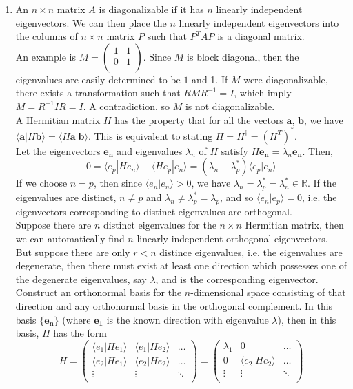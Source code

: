 \documentclass[a4paper]{article}
\begin{document}
\begin{ans}\leavevmode
\begin{enumerate}[label=(\alph*)]
\item An $n\times n$ matrix $A$ is diagonalizable if it has $n$ linearly independent eigenvectors. We can then place the $n$ linearly independent eigenvectors into the columns of $n\times n$ matrix $P$ such that $P^TAP$ is a diagonal matrix.\\[5pt]
An example is $M=\begin{pmatrix}1&1\\0&1\\\end{pmatrix}$. Since $M$ is block diagonal, then the eigenvalues are easily determined to be $1$ and 1. If $M$ were diagonalizable, there exists a transformation such that $RMR^{-1}=I$, which imply $M=R^{-1}IR=I$. A contradiction, so $M$ is not diagonalizable.\\[5pt]
A Hermitian matrix $H$ has the property that for all the vectors $\mathbf{a}$, $\mathbf{b}$, we have $\langle \mathbf{a}|H\mathbf{b}\rangle=\langle H\mathbf{a}|\mathbf{b}\rangle$. This is equivalent to stating $H=H^\dag=(H^T)^*$.\\[5pt]
Let the eigenvectors $\mathbf{e_n}$ and eigenvalues $\lambda_n$ of $H$ satisfy $H\mathbf{e_n}=\lambda_n\mathbf{e_n}$. Then,
$$0=\langle e_p|He_n\rangle-\langle He_p|e_n\rangle=(\lambda_n-\lambda_p^*)\langle e_p|e_n\rangle$$
If we choose $n=p$, then since $\langle e_n|e_n\rangle>0$, we have $\lambda_n=\lambda_p^*=\lambda_n^*\in\mathbb{R}$. If the eigenvalues are distinct, $n\neq p$ and $\lambda_n\neq\lambda_p^*=\lambda_p$, and so $\langle e_n|e_p\rangle=0$, i.e. the eigenvectors corresponding to distinct eigenvalues are orthogonal.\\[5pt]
Suppose there are $n$ distinct eigenvalues for the $n\times n$ Hermitian matrix, then we can automatically find $n$ linearly independent orthogonal eigenvectors.\\[5pt]
But suppose there are only $r<n$ distince eigenvalues, i.e. the eigenvalues are degenerate, then there must exist at least one direction which possesses one of the degenerate eigenvalues, say $\lambda$, and is the corresponding eigenvector. Construct an orthonormal basis for the $n$-dimensional space consisting of that direction and any orthonormal basis in the orthogonal complement. In this basis $\{\mathbf{e_n}\}$ (where $\mathbf{e_1}$ is the known direction with eigenvalue $\lambda$), then in this basis, $H$ has the form
$$H=\begin{pmatrix}\langle e_1|He_1\rangle&\langle e_1|He_2\rangle&\dots\\\langle e_2|He_1\rangle&\langle e_2|He_2\rangle&\dots\\\vdots&\vdots&\ddots\\\end{pmatrix}=\begin{pmatrix}\lambda_1&0&\dots\\0&\langle e_2|He_2\rangle&\dots\\\vdots&\vdots&\ddots\\\end{pmatrix}$$

\end{enumerate}
\end{ans}
\end{document}
